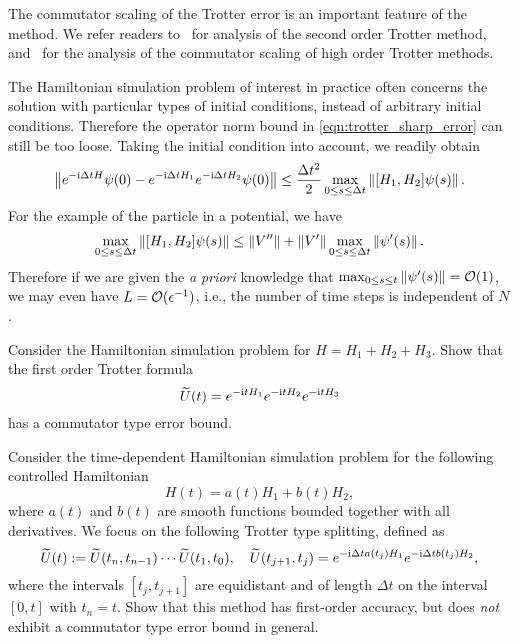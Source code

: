 The commutator scaling of the Trotter error is an important feature of the method. We refer readers to~\cite{JahnkeLubich2000} for analysis of the second order Trotter method, and~\cite{Thalhammer2008,ChildsSuTranEtAl2021} for the analysis of the commutator scaling of high order Trotter methods.


\begin{rem}
The Hamiltonian simulation problem of interest in practice often concerns the solution with particular types of initial conditions, instead of arbitrary initial conditions.
Therefore the operator norm bound in \cref{eqn:trotter_sharp_error} can still be too loose. 
Taking the initial condition into account, we readily obtain
\begin{equation}
\left\lVert e^{-\mathrm{i} \Delta t H}\psi(0)-e^{-\mathrm{i} \Delta t H_1}e^{-\mathrm{i} \Delta t H_2}\psi(0)\right\rVert\le \frac{\Delta t^2}{2}\max_{0\le s\le \Delta t}\left\lVert[H_1,H_2]\psi(s)\right\rVert.
\end{equation}
For the example of the particle in a potential, we have
\begin{equation}
\max_{0\le s\le \Delta t}\left\lVert[H_1,H_2]\psi(s)\right\rVert\le \left\lVert V''\right\rVert+\left\lVert V'\right\rVert\max_{0\le s\le \Delta t}\left\lVert\psi'(s)\right\rVert. 
\end{equation}
Therefore if we are given the \emph{a priori} knowledge that $\max_{0\le s\le t}\left\lVert\psi'(s)\right\rVert=\mathcal{O}(1)$, we may even have $L=\mathcal{O}(\epsilon^{-1})$, i.e., the number of time steps is independent of $N$.
\end{rem}


\vspace{2em}


\begin{exer}
Consider the Hamiltonian simulation problem for $H = H_1 + H_2 + H_3$. Show that the first order Trotter formula
\begin{equation*}
    \widetilde{U}(t) = e^{-\mathrm{i} t H_1} e^{-\mathrm{i} t H_2} e^{-\mathrm{i} t H_3}
\end{equation*}
has a commutator type error bound.
\end{exer}

\begin{exer}
Consider the time-dependent Hamiltonian simulation problem for the following controlled Hamiltonian
\[
H(t) = a(t) H_1 + b(t) H_2,
\]
where $a(t)$ and $b(t)$ are smooth functions bounded together with all derivatives. We focus on the following Trotter type splitting, defined as
    \begin{equation*}
    \widetilde{U}(t) :=   \widetilde{U}(t_{n}, t_{n-1}) \cdots \widetilde{U}(t_1, t_0), \quad
        \widetilde{U}(t_{j+1}, t_j) = e^{-\mathrm{i} \Delta t a(t_j) H_1} e^{-\mathrm{i} \Delta t b(t_j) H_2},
    \end{equation*}
    where the intervals $[t_j, t_{j+1}]$ are equidistant and of length $\Delta t$ on the interval $[0, t]$ with $t_n = t$. Show that this method has first-order accuracy, but does \textit{not} exhibit a commutator type error bound in general.
\end{exer}

